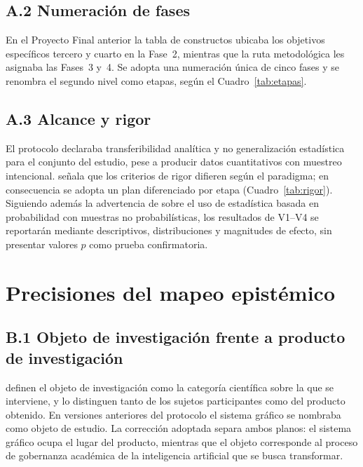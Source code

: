 \documentclass[letter,12pt]{article}
\begin{document}
\subsection*{A.2 Numeración de fases}

En el Proyecto Final anterior la tabla de constructos ubicaba los objetivos específicos tercero y cuarto en la Fase~2, mientras que la ruta metodológica les asignaba las Fases~3 y~4. Se adopta una numeración única de cinco fases y se renombra el segundo nivel como etapas, según el Cuadro~\ref{tab:etapas}.

\subsection*{A.3 Alcance y rigor}

El protocolo declaraba transferibilidad analítica y no generalización estadística para el conjunto del estudio, pese a producir datos cuantitativos con muestreo intencional. \citet{gaete} señala que los criterios de rigor difieren según el paradigma; en consecuencia se adopta un plan diferenciado por etapa (Cuadro~\ref{tab:rigor}). Siguiendo además la advertencia de \citet{guest2012} sobre el uso de estadística basada en probabilidad con muestras no probabilísticas, los resultados de V1--V4 se reportarán mediante descriptivos, distribuciones y magnitudes de efecto, sin presentar valores $p$ como prueba confirmatoria.

\section{Precisiones del mapeo epistémico}\label{anx:epistemico}

\subsection*{B.1 Objeto de investigación frente a producto de investigación}

\citet{deroncele2021} definen el objeto de investigación como la categoría científica sobre la que se interviene, y lo distinguen tanto de los sujetos participantes como del producto obtenido. En versiones anteriores del protocolo el sistema gráfico se nombraba como objeto de estudio. La corrección adoptada separa ambos planos: el sistema gráfico ocupa el lugar del producto, mientras que el objeto corresponde al proceso de gobernanza académica de la inteligencia artificial que se busca transformar.
\end{document}
